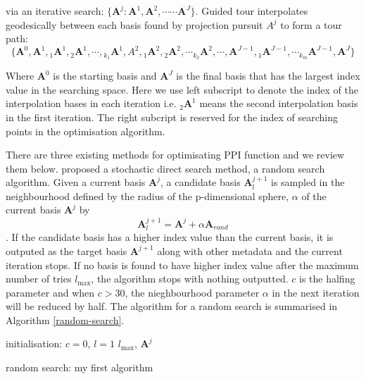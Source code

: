 \documentclass[12pt]{article}
\begin{document}
via an iterative search:
\(\{\mathbf{A}^j: \mathbf{A}^1, \mathbf{A}^2, \cdots \cdots \mathbf{A}^J\}\).
Guided tour interpolates geodesically between each basis found by
projection pursuit \(A^j\) to form a tour path:
\[\{ \mathbf{A}^0, \mathbf{A}^1, {}_{1}\mathbf{A}^1, {}_{2}\mathbf{A}^1,\cdots, {}_{k_1}\mathbf{A}^1, A^2, {}_{1}\mathbf{A}^2, {}_{2}\mathbf{A}^2, \cdots {}_{k_2}\mathbf{A}^2, \cdots, \mathbf{A}^{J-1}, {}_{1}\mathbf{A}^{J-1}, \cdots {}_{k_m}\mathbf{A}^{J-1} ,\mathbf{A}^J \}\]

Where \(\mathbf{A}^0\) is the starting basis and \(\mathbf{A}^J\) is the
final basis that has the largest index value in the searching space.
Here we use left subscript to denote the index of the interpolation
bases in each iteration i.e. \({}_{2}\mathbf{A}^1\) means the second
interpolation basis in the first iteration. The right subcript is
reserved for the index of searching points in the optimisation
algorithm.

There are three existing methods for optimisating PPI function and we
review them below. \citet{posse1995projection} proposed a stochastic
direct search method, a random search algorithm. Given a current basis
\(\mathbf{A}^{j}\), a candidate basis \(\mathbf{A}^{j +1}_l\) is sampled
in the neighbourhood defined by the radius of the p-dimensional sphere,
\(\alpha\) of the current basis \(\mathbf{A}^{j}\) by
\[\mathbf{A}^{j+1}_{l} = \mathbf{A}^{j} + \alpha \mathbf{A}_{rand}\]. If
the candidate basis has a higher index value than the current basis, it
is outputed as the target basis \(\mathbf{A}^{j + 1}\) along with other
metadata and the current iteration stops. If no basis is found to have
higher index value after the maximum number of tries \(l_{\max}\), the
algorithm stops with nothing outputted. \(c\) is the halfing parameter
and when \(c > 30\), the nieghbourhood parameter \(\alpha\) in the next
iteration will be reduced by half. The algorithm for a random search is
summarised in Algorithm \ref{random-search}.

\newpage
\begin{algorithm}[H]
\SetAlgoLined
  initialisation: $c = 0$, $l = 1$ $l_{\max}$, $\mathbf{A}^{j}$\;
  \caption{random search: my first algorithm}
  \label{random-search}
\end{algorithm}
\end{document}
